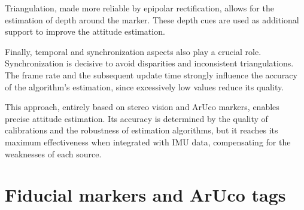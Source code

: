 Triangulation, made more reliable by epipolar rectification, allows for the estimation of depth around the marker. 
These depth cues are used as additional support to improve the attitude estimation.

Finally, temporal and synchronization aspects also play a crucial role. 
Synchronization is decisive to avoid disparities and inconsistent triangulations. 
The frame rate and the subsequent update time strongly influence the accuracy of the algorithm’s estimation, 
since excessively low values reduce its quality.

This approach, entirely based on stereo vision and ArUco markers, enables precise attitude estimation. 
Its accuracy is determined by the quality of calibrations and the robustness of estimation algorithms, 
but it reaches its maximum effectiveness when integrated with IMU data, 
compensating for the weaknesses of each source.

\section{Fiducial markers and ArUco tags}


